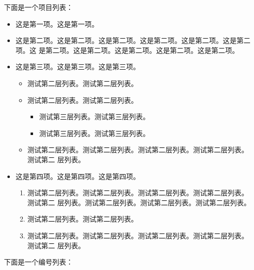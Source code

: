 \documentclass[phd,nobackinfo]{scutthesis}
\begin{document}
下面是一个项目列表：

\begin{itemize}
\item 这是第一项。这是第一项。
\item 这是第二项。这是第二项。这是第二项。这是第二项。这是第二项。这是第二项。这
  是第二项。这是第二项。这是第二项。这是第二项。这是第二项。
\item 这是第三项。这是第三项。这是第三项。
  \begin{itemize}
  \item 测试第二层列表。测试第二层列表。
  \item 测试第二层列表。测试第二层列表。
  \begin{itemize}
     \item 测试第三层列表。测试第三层列表。
     \item 测试第三层列表。测试第三层列表。
  \end{itemize}
  \item 测试第二层列表。测试第二层列表。测试第二层列表。测试第二层列表。测试第二
    层列表。
  \end{itemize}
\item 这是第四项。这是第四项。这是第四项。
  \begin{enumerate}
  \item 测试第二层列表。测试第二层列表。测试第二层列表。测试第二层列表。测试第二
    层列表。测试第二层列表。测试第二层列表。测试第二层列表。
  \item 测试第二层列表。测试第二层列表。
  \item 测试第二层列表。测试第二层列表。测试第二层列表。测试第二层列表。测试第二
    层列表。
  \end{enumerate}
\end{itemize}

下面是一个编号列表：
\end{document}
